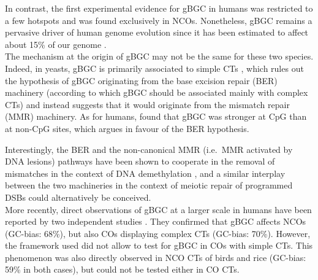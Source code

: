 In contrast, the first experimental evidence for gBGC in humans was restricted to a few hotspots \citep{odenthal-hesse2014transmission,arbeithuber2015crossovers} and was found exclusively in NCOs.
Nonetheless, gBGC remains a pervasive driver of human genome evolution since it has been estimated to affect about 15\% of our genome \citep{pouyet2018background}.\\

The mechanism at the origin of gBGC may not be the same for these two species.
Indeed, in yeasts, gBGC is primarily associated to simple CTs \citep{lesecque2013gcbiased}, which rules out the hypothesis of gBGC originating from the base excision repair (BER) machinery (according to which gBGC should be associated mainly with complex CTs) and instead suggests that it would originate from the mismatch repair (MMR) machinery.
As for humans, \citet{halldorsson2016rate} found that gBGC was stronger at CpG than at non-CpG sites, which argues in favour of the BER hypothesis.

Interestingly, the BER and the non-canonical MMR (i.e.\ MMR activated by DNA lesions) pathways have been shown to cooperate in the removal of mismatches in the context of DNA demethylation \citep{grin2016interplay}, and a similar interplay between the two machineries in the context of meiotic repair of programmed DSBs could alternatively be conceived.\\

More recently, direct observations of gBGC at a larger scale in humans have been reported by two independent studies \citep{williams2015noncrossover, halldorsson2016rate}.
They confirmed that gBGC affects NCOs (GC-bias: 68\%), but also COs displaying complex CTs (GC-bias: 70\%).
However, the framework used did not allow to test for gBGC in COs with simple CTs.
This phenomenon was also directly observed in NCO CTs of birds \citep{smeds2016highresolution} and rice \citep{si2015widely} (GC-bias: 59\% in both cases), but could not be tested either in CO CTs.

